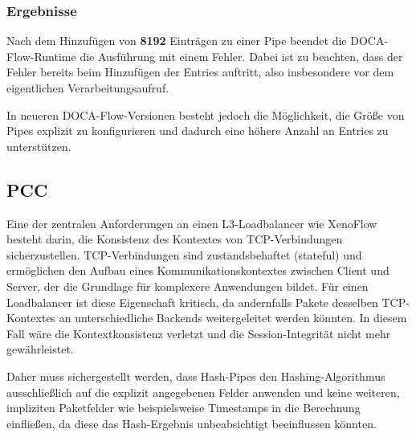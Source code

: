 \documentclass[paper=a4, fontsize=11pt]{scrartcl} %
\numberwithin{equation}{section} %
\numberwithin{figure}{section} %
\numberwithin{table}{section} %
\begin{document}
\subsubsection*{Ergebnisse}
Nach dem Hinzufügen von \textbf{8192} Einträgen zu einer Pipe beendet die DOCA-Flow-Runtime die Ausführung mit einem Fehler. Dabei ist zu beachten, dass der Fehler bereits beim Hinzufügen der Entries auftritt, also insbesondere vor dem eigentlichen Verarbeitungsaufruf.

In neueren DOCA-Flow-Versionen besteht jedoch die Möglichkeit, die Größe von Pipes explizit zu konfigurieren und dadurch eine höhere Anzahl an Entries zu unterstützen.

\newpage

\subsection{PCC}
Eine der zentralen Anforderungen an einen L3-Loadbalancer wie XenoFlow besteht darin, die Konsistenz des Kontextes von TCP-Verbindungen sicherzustellen. TCP-Verbindungen sind zustandsbehaftet (stateful) und ermöglichen den Aufbau eines Kommunikationskontextes zwischen Client und Server, der die Grundlage für komplexere Anwendungen bildet. Für einen Loadbalancer ist diese Eigenschaft kritisch, da andernfalls Pakete desselben TCP-Kontextes an unterschiedliche Backends weitergeleitet werden könnten. In diesem Fall wäre die Kontextkonsistenz verletzt und die Session-Integrität nicht mehr gewährleistet.

Daher muss sichergestellt werden, dass Hash-Pipes den Hashing-Algorithmus ausschließlich auf die explizit angegebenen Felder anwenden und keine weiteren, impliziten Paketfelder wie beispielsweise Timestamps in die Berechnung einfließen, da diese das Hash-Ergebnis unbeabsichtigt beeinflussen könnten.
\end{document}
